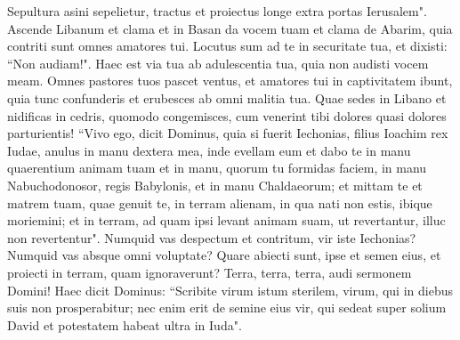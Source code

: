 \begin{biblechapter}
\verse Sepultura asini sepelietur, tractus et proiectus longe extra portas Ierusalem". 
\verse Ascende Libanum et clama et in Basan da vocem tuam et clama de Abarim, quia contriti sunt omnes amatores tui. 
\verse Locutus sum ad te in securitate tua, et dixisti: “Non audiam!". Haec est via tua ab adulescentia tua, quia non audisti vocem meam. 
\verse Omnes pastores tuos pascet ventus, et amatores tui in captivitatem ibunt, quia tunc confunderis et erubesces ab omni malitia tua. 
\verse Quae sedes in Libano et nidificas in cedris, quomodo congemisces, cum venerint tibi dolores quasi dolores parturientis! 
\verse “Vivo ego, dicit Dominus, quia si fuerit Iechonias, filius Ioachim rex Iudae, anulus in manu dextera mea, inde evellam eum 
\verse et dabo te in manu quaerentium animam tuam et in manu, quorum tu formidas faciem, in manu Nabuchodonosor, regis Babylonis, et in manu Chaldaeorum; 
\verse et mittam te et matrem tuam, quae genuit te, in terram alienam, in qua nati non estis, ibique moriemini; 
\verse et in terram, ad quam ipsi levant animam suam, ut revertantur, illuc non revertentur". 
\verse Numquid vas despectum et contritum, vir iste Iechonias? Numquid vas absque omni voluptate? Quare abiecti sunt, ipse et semen eius, et proiecti in terram, quam ignoraverunt? 
\verse Terra, terra, terra, audi sermonem Domini! 
\verse Haec dicit Dominus: “Scribite virum istum sterilem, virum, qui in diebus suis non prosperabitur; nec enim erit de semine eius vir, qui sedeat super solium David et potestatem habeat ultra in Iuda". 
\end{biblechapter}

